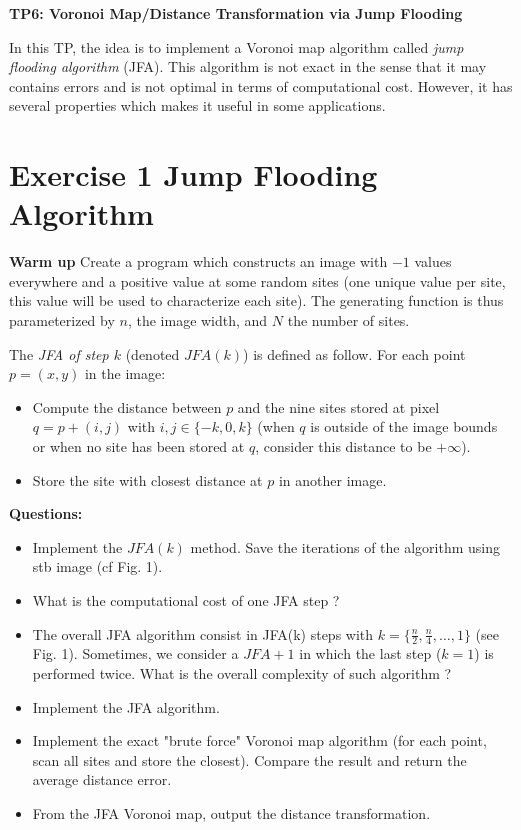\documentclass[a4paper, 11pt]{article}
\title{}
\author{}
\date{}
\begin{document}
\begin{center}
	\LARGE \textbf{TP6: Voronoi Map/Distance Transformation via Jump Flooding}
\end{center}

\bigskip
\par In this TP, the idea is to implement a Voronoi map algorithm called \emph{jump flooding algorithm} (JFA). This algorithm is not exact in the sense that it may contains errors and is not optimal in terms of computational cost. However, it has several properties which makes it useful in some applications.



\section*{Exercise 1 \rm Jump Flooding Algorithm}

{\bf Warm up} Create a program which constructs an image with $-1$  values everywhere and a positive  value at some random sites (one unique value per site, this value will be used to characterize each site). The generating function is thus parameterized by $n$, the image width, and $N$ the number of sites. 


\par The \emph{JFA of step $k$} (denoted $JFA(k)$) is defined as follow. For each point $p=(x,y)$ in the image:
	\begin{itemize}
	\item Compute the distance between $p$ and the nine sites stored at pixel $q = p + (i,j)$ with $i,j \in \{-k, 0, k\}$ (when $q$ is outside of the image bounds or when no site has been stored at $q$, consider this distance to be $+\infty$).
	\item Store the site with closest distance at $p$ in another image.
	\end{itemize}


\bigskip
{\bf Questions:}
\begin{itemize}
	\item Implement the $JFA(k)$ method. Save the iterations of the algorithm using stb image (cf Fig. 1).
	\item What is the computational cost of one JFA step ?
	\item The overall JFA algorithm consist in JFA(k) steps with $k=\{\frac{n}{2}, \frac{n}{4}, \ldots, 1\}$ (see Fig. 1). Sometimes, we consider a $JFA+1$ in which the last step ($k=1$) is performed twice. What is the overall complexity of such algorithm ?
	\item Implement the JFA algorithm.
	\item Implement the exact "brute force" Voronoi map algorithm (for each point, scan all sites and store the closest). Compare the result and return the average distance error.
	\item From the JFA Voronoi map, output the distance transformation.
\end{itemize}
\end{document}

